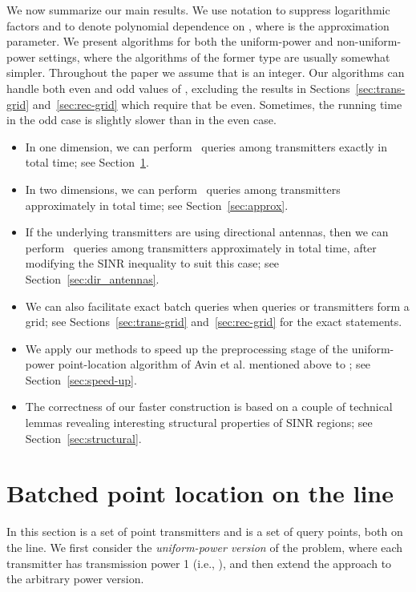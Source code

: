 \documentclass[11pt]{article}
\theoremstyle{remark}
\begin{document}
We now summarize our main results.
We use  notation to suppress logarithmic factors and  to denote polynomial dependence on , where  is the approximation parameter.  We present algorithms for both the uniform-power and non-uniform-power settings, where the algorithms of the former type are usually somewhat simpler.
Throughout the paper we assume that  is an integer. Our algorithms can handle both even and odd values of , excluding the results in Sections~\ref{sec:trans-grid} and~\ref{sec:rec-grid} which require that  be even. Sometimes, the running time in the odd case is slightly slower than in the even case.
\begin{itemize}
\item In one dimension, we can perform ~queries among  transmitters exactly in  total time; see Section~\ref{sec:1d}.
\item In two dimensions, we can perform ~queries among  transmitters approximately in  total time; see Section~\ref{sec:approx}. 
\item If the underlying transmitters are using directional antennas, then we can perform ~queries among  transmitters approximately in  total time, after modifying the SINR inequality to suit this case; see Section~\ref{sec:dir_antennas}.
\item We can also facilitate exact batch queries when queries or transmitters form a grid; see Sections~\ref{sec:trans-grid} and~\ref{sec:rec-grid} for the exact statements.
\item
We apply our methods to speed up the preprocessing stage of the uniform-power point-location algorithm of Avin et al. \cite{aeklpr-sdciawn-12} mentioned above to ; see Section~\ref{sec:speed-up}.
\item
The correctness of our faster construction is based on a couple of technical lemmas revealing interesting structural properties of SINR regions; see Section~\ref{sec:structural}.  
\end{itemize}







\section{Batched point location on the line}
\label{sec:1d}

In this section  is a set of  point transmitters and  is a set of  query points, both on the line.
We first consider the \emph{uniform-power version} of the problem, where each transmitter has transmission power 1 (i.e., ), and then extend the approach to the arbitrary power version. 
\end{document}
